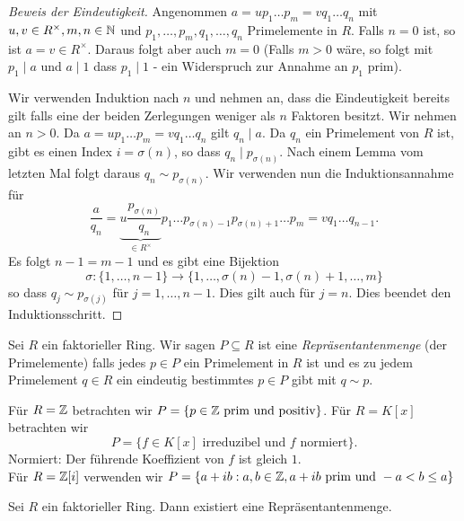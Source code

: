 \begin{proof}[Beweis der Eindeutigkeit]
	Angenommen $a = u p_1 \ldots p_{m} = v q_1 \ldots q_{n}$ mit $u,v \in R^{\times}, m,n \in \mathbb{N}$ und
	$p_1,\ldots,p_{m}, q_1,\ldots, q_{n}$ Primelemente in $R$.
	Falls $n = 0$ ist, so ist $a = v \in R^{\times}$.
	Daraus folgt aber auch $m = 0$
	(Falls $m > 0$ wäre, so folgt mit $p_1 \mid a$ und $a \mid 1$ dass $p_1 \mid 1$ - ein Widerspruch zur Annahme an $p_1$ prim).

	Wir verwenden Induktion nach $n$ und nehmen an, dass die Eindeutigkeit 
	bereits gilt falls eine der beiden Zerlegungen weniger als $n$ Faktoren besitzt.
	Wir nehmen an $n > 0$.
	Da $a = u p_1 \ldots p_{m} = v q_1 \ldots q_{n}$ gilt $q_{n} \mid a$.
	Da $q_{n}$ ein Primelement von $R$ ist, gibt es einen Index $i = \sigma(n)$, so dass $q_{n} \mid p_{\sigma(n)}$.
	Nach einem Lemma vom letzten Mal folgt daraus $q_{n} \sim p_{\sigma(n)}$.
	Wir verwenden nun die Induktionsannahme für
	\[
		\frac{a}{q_{n}} = \underbrace{u \frac{p_{\sigma(n)}}{q_{n}}}_{\in R^{\times}} p_1 \ldots p_{\sigma(n) -1} p_{\sigma(n) + 1} \ldots p_{m} = 
		v q_1 \ldots q_{n-1}
	.\] 
	Es folgt $n-1 = m-1$ und es gibt eine Bijektion 
	\[
		\sigma: \{1,\ldots,n-1\} \to \{1,\ldots, \sigma(n)-1, \sigma(n) + 1, \ldots, m\} 
	\] 
	so dass $q_{j} \sim p_{\sigma(j)}$ für $j = 1,\ldots,n-1$.
	Dies gilt auch für $j = n$.
	Dies beendet den Induktionsschritt.
\end{proof}

\begin{definition}
	Sei $R$ ein faktorieller Ring.
	Wir sagen $P \subseteq R$ ist eine \emph{Repräsentantenmenge} (der Primelemente) falls jedes $p \in P$ ein Primelement in $R$ ist
	und es zu jedem Primelement $q \in R$ ein eindeutig bestimmtes $p \in P$ gibt mit $q \sim p$.
\end{definition}

\begin{eg}
	Für $R = \mathbb{Z}$ betrachten wir $P = \{p \in \mathbb{Z} \text{ prim und positiv}\} $.
	Für $R = K[x]$ betrachten wir 
	\[
		P = \{f \in K[x] \text{ irreduzibel und $f$ normiert}\} 
	.\] 
	Normiert: Der führende Koeffizient von $f$ ist gleich $1$.\\
	Für $R = \mathbb{Z}[i]$ verwenden wir $P = \{a+ib : a,b \in \mathbb{Z}, a+ib \text{ prim und } -a < b \leq a\} $
\end{eg}

\begin{lemma}
	Sei $R$ ein faktorieller Ring.
	Dann existiert eine Repräsentantenmenge.
\end{lemma}

